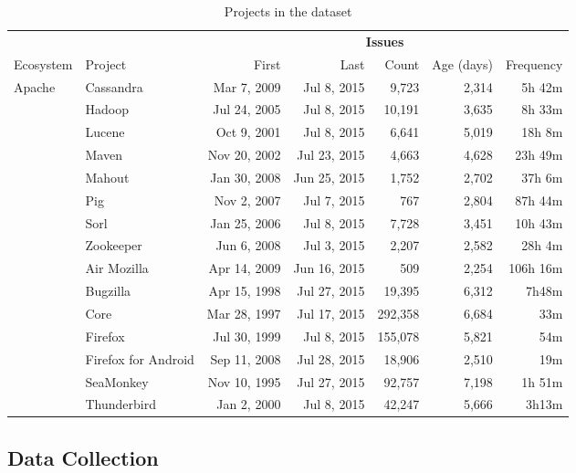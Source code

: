 \begin{table*}[h]
\begin{center}
\caption{Projects in the dataset}\label{tab:dataset-projects}
\begin{tabular}{l|l|rrrrr}
 &               & \multicolumn{5}{c}{{\bf Issues}} \\
Ecosystem & Project & First & Last & Count & Age (days) & Frequency \\
\hline
\multirow{9}{*}{Apache}
 & Cassandra & Mar 7, 2009 & Jul 8, 2015 & 9,723 & 2,314 & 5h 42m \\
 & Hadoop & Jul 24, 2005 & Jul 8, 2015 & 10,191 & 3,635 & 8h 33m \\
 & Lucene & Oct 9, 2001 & Jul 8, 2015 & 6,641 & 5,019 & 18h 8m \\
 & Maven & Nov 20, 2002 & Jul 23, 2015 & 4,663 & 4,628 & 23h 49m \\
 & Mahout & Jan 30, 2008 & Jun 25, 2015 & 1,752 & 2,702 & 37h 6m \\
 & Pig & Nov 2, 2007 & Jul 7, 2015 & 767 & 2,804 & 87h 44m \\
 & Sorl & Jan 25, 2006 & Jul 8, 2015 & 7,728 & 3,451 & 10h 43m \\
 & Zookeeper & Jun 6, 2008 & Jul 3, 2015 & 2,207 & 2,582 & 28h 4m \\
\hline
\multirow{6}{*}{Mozilla}
 & Air Mozilla & Apr 14, 2009 & Jun 16, 2015 & 509 & 2,254 & 106h 16m \\
 & Bugzilla & Apr 15, 1998 & Jul 27, 2015 & 19,395 & 6,312 & 7h48m \\
 & Core & Mar 28, 1997 & Jul 17, 2015 & 292,358 & 6,684 & 33m \\
 & Firefox & Jul 30, 1999 & Jul 8, 2015 & 155,078 & 5,821 & 54m \\
 & Firefox for Android & Sep 11, 2008 & Jul 28, 2015 & 18,906 & 2,510 & 19m \\
 & SeaMonkey & Nov 10, 1995 & Jul 27, 2015 & 92,757 & 7,198 & 1h 51m \\
 & Thunderbird & Jan 2, 2000 & Jul 8, 2015 & 42,247 & 5,666 & 3h13m\\\hline
\end{tabular}
\end{center}
\end{table*}


\subsection{Data Collection} \label{sec:model-collection}

